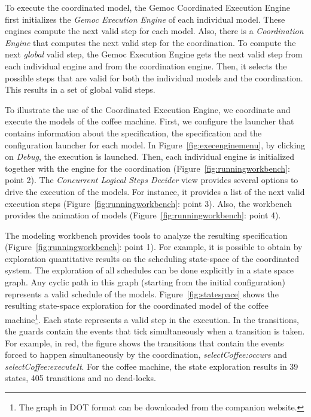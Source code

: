To execute the coordinated model, the Gemoc Coordinated Execution Engine first initializes the \emph{Gemoc Execution Engine} of each individual model. These engines compute the next valid step for each model. Also, there is a \emph{Coordination Engine} that computes the next valid step for the coordination. To compute the next \emph{global} valid step, the Gemoc Execution Engine gets the next valid step from each individual engine and from the coordination engine. Then, it selects the possible steps that are valid for both the individual models and the coordination. This results in a set of global valid steps. 

To illustrate the use of the Coordinated Execution Engine, we coordinate and execute the models of the coffee machine. First, we configure the launcher that contains information about the \bcool specification, the \bflow specification and the configuration launcher for each model. In Figure~\ref{fig:execenginemenu}, by clicking on \emph{Debug}, the execution is launched. Then, each individual engine is initialized together with the engine for the coordination (Figure~\ref{fig:runningworkbench}: point 2). The \emph{Concurrent Logical Steps Decider} view provides several options to drive the execution of the models. For instance, it provides a list of the next valid execution steps (Figure~\ref{fig:runningworkbench}: point 3). Also, the workbench provides the animation of models (Figure~\ref{fig:runningworkbench}: point 4). 

The modeling workbench provides tools to analyze the resulting \ccsl specification (Figure~\ref{fig:runningworkbench}: point 1). For example, it is possible to obtain by exploration quantitative results on the scheduling state-space of the coordinated system. The exploration of all schedules can be done explicitly in a state space graph. Any cyclic path in this graph (starting from the initial configuration) represents a valid schedule of the models. Figure~\ref{fig:statespace} shows the resulting state-space exploration for the coordinated model of the coffee machine\footnote{The graph in DOT format can be downloaded from the companion website.}. Each state represents a valid step in the execution. In the transitions, the guards contain the events that tick simultaneously when a transition is taken. For example, in red, the figure shows the transitions that contain the events forced to happen simultaneously by the coordination, \eg \emph{selectCoffee:occurs} and \emph{selectCoffee:executeIt}. For the coffee machine, the state exploration results in 39 states, 405 transitions and no dead-locks.    


